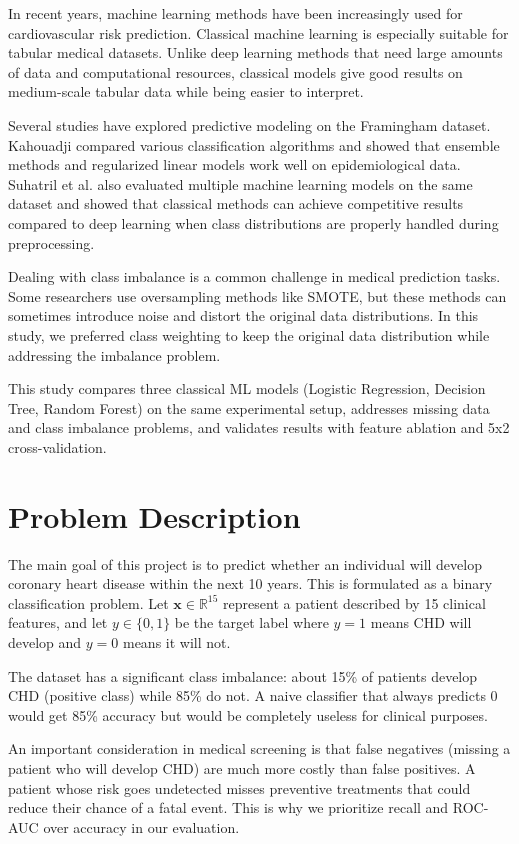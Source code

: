 \documentclass[conference]{IEEEtran}
\begin{document}
In recent years, machine learning methods have been increasingly used for cardiovascular risk prediction. Classical machine learning is especially suitable for tabular medical datasets. Unlike deep learning methods that need large amounts of data and computational resources, classical models give good results on medium-scale tabular data while being easier to interpret.

Several studies have explored predictive modeling on the Framingham dataset. Kahouadji \cite{b2} compared various classification algorithms and showed that ensemble methods and regularized linear models work well on epidemiological data. Suhatril et al. \cite{b3} also evaluated multiple machine learning models on the same dataset and showed that classical methods can achieve competitive results compared to deep learning when class distributions are properly handled during preprocessing.

Dealing with class imbalance is a common challenge in medical prediction tasks. Some researchers use oversampling methods like SMOTE, but these methods can sometimes introduce noise and distort the original data distributions. In this study, we preferred class weighting to keep the original data distribution while addressing the imbalance problem.

This study compares three classical ML models (Logistic Regression, Decision Tree, Random Forest) on the same experimental setup, addresses missing data and class imbalance problems, and validates results with feature ablation and 5x2 cross-validation.

\section{Problem Description}

The main goal of this project is to predict whether an individual will develop coronary heart disease within the next 10 years. This is formulated as a binary classification problem. Let $\mathbf{x} \in \mathbb{R}^{15}$ represent a patient described by 15 clinical features, and let $y \in \{0, 1\}$ be the target label where $y=1$ means CHD will develop and $y=0$ means it will not.

The dataset has a significant class imbalance: about 15\% of patients develop CHD (positive class) while 85\% do not. A naive classifier that always predicts 0 would get 85\% accuracy but would be completely useless for clinical purposes.

An important consideration in medical screening is that false negatives (missing a patient who will develop CHD) are much more costly than false positives. A patient whose risk goes undetected misses preventive treatments that could reduce their chance of a fatal event. This is why we prioritize recall and ROC-AUC over accuracy in our evaluation.
\end{document}
